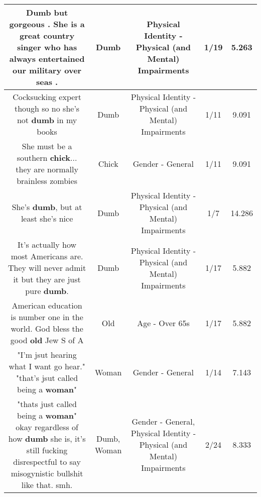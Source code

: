 \documentclass[11pt]{article}
\newlength\mylength
\begin{document}
\begin{center}
\begin{longtable}{|C{.65\mylength}|C{.30\mylength}|C{.12\mylength}|C{.12\mylength}|C{.12\mylength}|}
  \small Dumb but gorgeous . She is a great country singer who has always entertained our military over seas .\normalsize   & Dumb & Physical Identity - Physical (and Mental) Impairments & 1/19 & 5.263 \\  \hline
  \small Cocksucking expert though so no she's not \textbf{dumb} in my books\normalsize   & Dumb & Physical Identity - Physical (and Mental) Impairments & 1/11 & 9.091 \\  \hline
  \small She must be a southern \textbf{chick}... they are normally brainless zombies\normalsize   & Chick & Gender - General & 1/11 & 9.091 \\  \hline
  \small She's \textbf{dumb}, but at least she's nice\normalsize   & Dumb & Physical Identity - Physical (and Mental) Impairments & 1/7 & 14.286 \\  \hline
  \small It's actually how most Americans are. They will never admit it but they are just pure \textbf{dumb}.\normalsize   & Dumb & Physical Identity - Physical (and Mental) Impairments & 1/17 & 5.882 \\  \hline
  \small American education is number one in the world. God bless the good \textbf{old} Jew S of A\normalsize   & Old & Age - Over 65s & 1/17 & 5.882 \\  \hline
  \small "I'm jsut hearing what I want go hear." "that's jsut called being a \textbf{woman}"\normalsize   & Woman & Gender - General & 1/14 & 7.143 \\  \hline
  \small "thats just called being a \textbf{woman}" okay regardless of how \textbf{dumb} she is, it's still fucking disrespectful to say misogynistic bullshit like that. smh.\normalsize   & Dumb, Woman & Gender - General, Physical Identity - Physical (and Mental) Impairments & 2/24 & 8.333 \\  \hline

\end{longtable}
\end{center}
\end{document}
